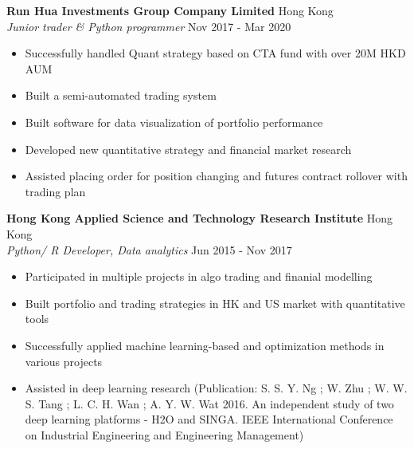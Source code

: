 \documentclass[a4paper]{article}
\begin{document}
\textbf{Run Hua Investments Group Company Limited} \hfill Hong Kong\\
\textit{Junior trader \& Python programmer} \hfill Nov 2017 - Mar 2020\\
\vspace{-1mm}
\begin{itemize} \itemsep 1pt
	\item Successfully handled Quant strategy based on CTA fund with over 20M HKD AUM
	\item Built a semi-automated trading system
	\item Built software for data visualization of portfolio performance
	\item Developed new quantitative strategy and financial market research
        \item Assisted placing order for position changing and futures contract rollover with trading plan
\end{itemize}
\textbf{Hong Kong Applied Science and Technology Research Institute} \hfill Hong Kong\\
\textit{Python/ R Developer, Data analytics} \hfill Jun 2015 - Nov 2017\\
\vspace{-1mm}
\begin{itemize} \itemsep 1pt
	\item Participated in multiple projects in algo trading and finanial modelling
	\item Built portfolio and trading strategies in HK and US market with quantitative tools
	\item Successfully applied machine learning-based and optimization methods in various projects
	\item Assisted in deep learning research (Publication: S. S. Y. Ng ; W. Zhu ; W. W. S. Tang ; L. C. H. Wan ; A. Y. W. Wat 2016. An independent study of two deep learning platforms - H2O and SINGA. IEEE International Conference on Industrial Engineering and Engineering Management)
\end{itemize}
\end{document}
